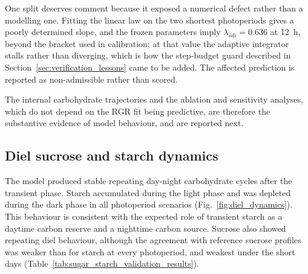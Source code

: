 \documentclass[a4paper,fleqn]{cas-sc}
\begin{document}
One split deserves comment because it exposed a numerical defect rather than a
modelling one. Fitting the linear law on the two shortest photoperiods gives a
poorly determined slope, and the frozen parameters imply $\lambda_{sdi} =
0.636$ at 12~h, beyond the bracket used in calibration; at that value the
adaptive integrator stalls rather than diverging, which is how the step-budget
guard described in Section~\ref{sec:verification_lessons} came to be added. The
affected prediction is reported as non-admissible rather than scored.

The internal carbohydrate trajectories and the ablation and sensitivity
analyses, which do not depend on the RGR fit being predictive, are therefore
the substantive evidence of model behaviour, and are reported next.

\subsection{Diel sucrose and starch dynamics}

The model produced stable repeating day-night carbohydrate cycles after the
transient phase. Starch accumulated during the light phase and was depleted
during the dark phase in all photoperiod scenarios
(Fig.~\ref{fig:diel_dynamics}). This behaviour is consistent
with the expected role of transient starch as a daytime carbon reserve and a
nighttime carbon source. Sucrose also showed repeating diel behaviour, although
the agreement with reference sucrose profiles was weaker than for starch at
every photoperiod, and weakest under the short days
(Table~\ref{tab:sugar_starch_validation_results}).
\end{document}
